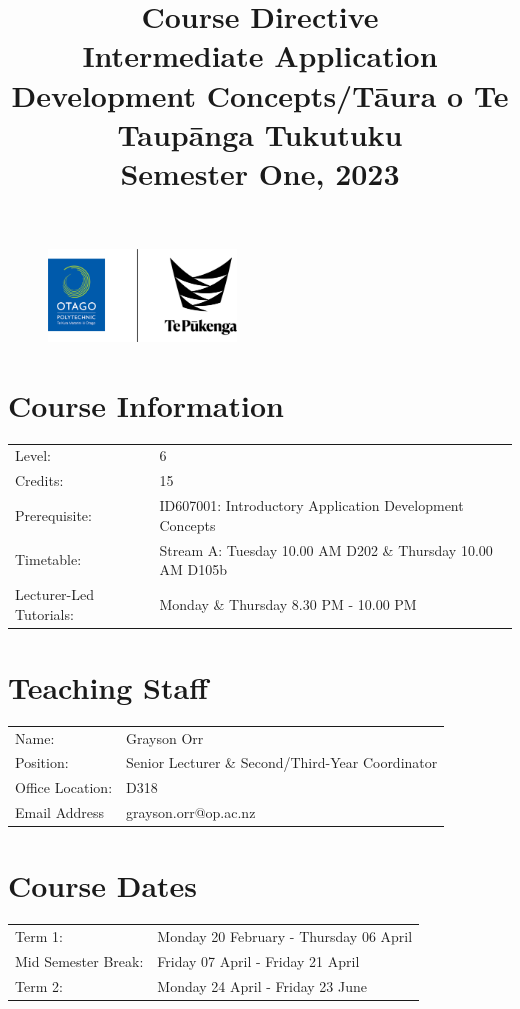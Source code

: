 \documentclass{article}
\author{}
\begin{document}
\begin{figure}
	\centering
	\includegraphics[width=50mm]{../img/logo.png}
\end{figure} 

\title{Course Directive\\Intermediate Application Development Concepts/Tāura o Te Taupānga Tukutuku\\Semester One, 2023}
\date{}
\maketitle

\section*{Course Information}
\begin{tabular}{ll}
	Level:        & 6 \\
	Credits:      & 15                                                             \\
	Prerequisite: & ID607001: Introductory Application Development Concepts                                 \\
	Timetable:    & Stream A: Tuesday 10.00 AM D202 \& Thursday 10.00 AM D105b  \\
	Lecturer-Led Tutorials:    & Monday \& Thursday 8.30 PM - 10.00 PM     \\     
\end{tabular}

\section*{Teaching Staff}
\begin{tabular}{ll}
	Name:            & Grayson Orr                           \\
	Position:        & Senior Lecturer \& Second/Third-Year Coordinator\\
	Office Location: & D318                                 \\
	Email Address    & grayson.orr@op.ac.nz                    \\
\end{tabular}

\section*{Course Dates}
\begin{tabular}{ll}
	Term 1:             &  Monday 20 February - Thursday 06 April \\
	Mid Semester Break: &  Friday 07 April - Friday 21 April     \\
	Term 2:             &  Monday 24 April - Friday 23 June      \\
\end{tabular}
\end{document}

